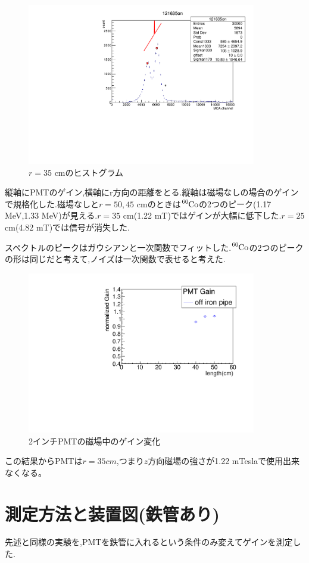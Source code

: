 \begin{figure}[h]
	\centering
	\includegraphics[angle=-90,width=10cm]{fig/iguchi/121635on.pdf}
	\caption{$r=35$ cmのヒストグラム}
	\label{hist35}
\end{figure}

縦軸にPMTのゲイン,横軸にr方向の距離をとる.縦軸は磁場なしの場合のゲインで規格化した.磁場なしと$r=50,45$ cmのときは$\ce{^{60}Co}$の2つのピーク(1.17 MeV,1.33 MeV)が見える.$r=35$ cm(1.22 mT)ではゲインが大幅に低下した.$r=25$ cm(4.82 mT)では信号が消失した.

スペクトルのピークはガウシアンと一次関数でフィットした.$\ce{^{60}Co}$の2つのピークの形は同じだと考えて,ノイズは一次関数で表せると考えた.


\begin{figure}[t]
	\centering
		\includegraphics[angle=-90,width=10cm]{fig/iguchi/plot2inchPMT.pdf}
	\caption{2インチPMTの磁場中のゲイン変化}
	\label{plot2inchoff}
\end{figure}

この結果からPMTは$r=35 cm$,つまり$z$方向磁場の強さが1.22 mTeslaで使用出来なくなる。

\section{測定方法と装置図(鉄管あり)}
先述と同様の実験を,PMTを鉄管に入れるという条件のみ変えてゲインを測定した.


